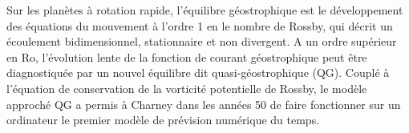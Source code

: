 \mk
Sur les planètes à rotation rapide, l'équilibre géostrophique est le développement des équations du mouvement à l'ordre 1 en le nombre de Rossby, qui décrit un écoulement bidimensionnel, stationnaire et non divergent. A un ordre supérieur en $\textrm{Ro}$, l'évolution lente de la fonction de courant géostrophique peut être diagnostiquée par un nouvel équilibre dit quasi-géostrophique (QG). Couplé à l'équation de conservation de la vorticité potentielle de Rossby, le modèle approché QG a permis à Charney dans les années 50 de faire fonctionner sur un ordinateur le premier modèle de prévision numérique du temps.
